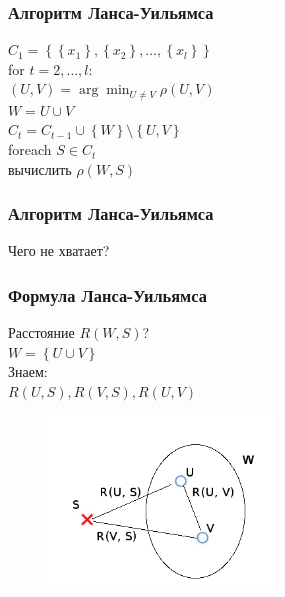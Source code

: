 \documentclass[12pt]{beamer}
\begin{document}
\begin{frame}\frametitle{Алгоритм Ланса-Уильямса}

${C_1 = \left\{ \left\{ x_1\right\}, \left\{x_2 \right\}, \dots, \left\{x_l \right\} \right\}}$\\
for ${t=2, \dots, l }$:\\
\hspace{5mm} ${(U, V) = \arg\min_{U \neq V} \rho(U, V)}$\\
\hspace{5mm} $W = U \cup V$\\
\hspace{5mm} ${C_t = C_{t-1} \cup \left\{ W \right\}\setminus \left\{U, V \right\} }$\\
\hspace{5mm} foreach ${S \in C_t}$\\
\hspace{10mm}   вычислить $\rho(W, S)$\\

\end{frame}


\begin{frame}\frametitle{Алгоритм Ланса-Уильямса}
Чего не хватает?
\end{frame}

\begin{frame}\frametitle{Формула Ланса-Уильямса}
\begin{minipage}[t]{0.55\linewidth}
Расстояние $R(W, S)$?\\
${ W = \left\{ U \cup V \right\} }$\\
\vspace{5mm}
Знаем:\\
${R(U, S), R(V, S), R(U, V)}$

\end{minipage}%
\begin{minipage}[t]{0.45\linewidth}
    \begin{figure}[htbp]
  \includegraphics[height=130pt, keepaspectratio = true]{images/lans-formula}  
\end{figure}
\end{minipage}%

\end{frame}
\end{document}
